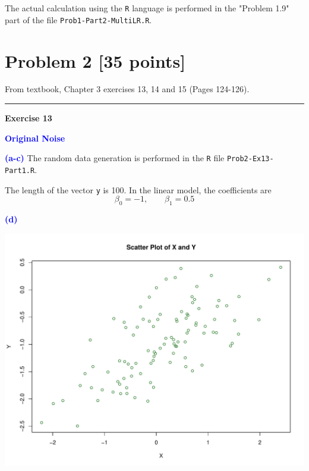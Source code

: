 \documentclass[a4paper,12pt]{article}
\newcommand{\code}[1]{\texttt{#1}}
\newcommand{\qnum}[1]{\noindent\textcolor{blue}{\textbf{(#1)}}}
\newcommand{\sep}{\begin{center}\textcolor{gray}{\rule{\textwidth}{0.75pt}}\end{center}}
\begin{document}
The actual calculation using the \code{R} language is performed in the "Problem 1.9" part of the file \code{Prob1-Part2-MultiLR.R}.






 
\newpage
\section*{Problem 2 [35 points]} 

From textbook,  Chapter 3 exercises 13, 14  and 15 (Pages 124-126).
\sep 











\begin{center}
    \textcolor{myfirebrick}{\textbf{Exercise 13}}
\end{center}
\newcommand{\yr}{\textcolor{myfirebrick}{\code{y}} }
\newcommand{\xr}{\textcolor{myfirebrick}{\code{x}} }

\noindent\textcolor{blue}{\textbf{Original Noise}}\bigskip 

\qnum{a-c} 
The random data generation is performed in the \code{R} file \code{Prob2-Ex13-Part1.R}.

The length of the vector \yr is 100.
In the linear model, the coefficients are
\[
    \beta_0 = -1,\qquad 
    \beta_1 = 0.5
\]




\qnum{d} 
\begin{center}
    \includegraphics[width=0.9\linewidth]{Images/Prob2-Ex13-d.pdf}
\end{center}
\end{document}
